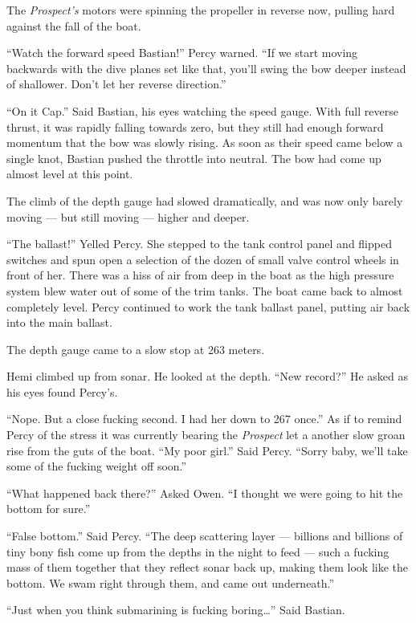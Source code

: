 \documentclass[
]{scrbook}
\begin{document}
The \emph{Prospect's} motors were spinning the propeller in reverse now,
pulling hard against the fall of the boat.

``Watch the forward speed Bastian!'' Percy warned. ``If we start moving
backwards with the dive planes set like that, you'll swing the bow
deeper instead of shallower. Don't let her reverse direction.''

``On it Cap.'' Said Bastian, his eyes watching the speed gauge. With
full reverse thrust, it was rapidly falling towards zero, but they still
had enough forward momentum that the bow was slowly rising. As soon as
their speed came below a single knot, Bastian pushed the throttle into
neutral. The bow had come up almost level at this point.

The climb of the depth gauge had slowed dramatically, and was now only
barely moving --- but still moving --- higher and deeper.

``The ballast!'' Yelled Percy. She stepped to the tank control panel and
flipped switches and spun open a selection of the dozen of small valve
control wheels in front of her. There was a hiss of air from deep in the
boat as the high pressure system blew water out of some of the trim
tanks. The boat came back to almost completely level. Percy continued to
work the tank ballast panel, putting air back into the main ballast.

The depth gauge came to a slow stop at 263 meters.

Hemi climbed up from sonar. He looked at the depth. ``New record?'' He
asked as his eyes found Percy's.

``Nope. But a close fucking second. I had her down to 267 once.'' As if
to remind Percy of the stress it was currently bearing the
\emph{Prospect} let a another slow groan rise from the guts of the boat.
``My poor girl.'' Said Percy. ``Sorry baby, we'll take some of the
fucking weight off soon.''

``What happened back there?'' Asked Owen. ``I thought we were going to
hit the bottom for sure.''

``False bottom.'' Said Percy. ``The deep scattering layer --- billions
and billions of tiny bony fish come up from the depths in the night to
feed --- such a fucking mass of them together that they reflect sonar
back up, making them look like the bottom. We swam right through them,
and came out underneath.''

``Just when you think submarining is fucking boring\ldots{}'' Said
Bastian.
\end{document}
